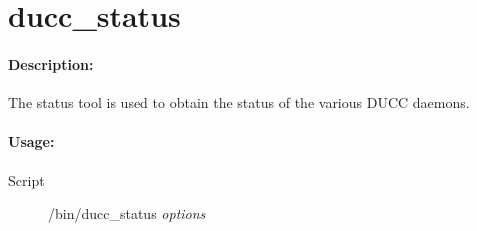 % 
% 
% 
% 
\ifpdf
\else
{}
\fi
    \section{ducc\_status}
    \label{sec:cli.tools-ducc-status}    

  \paragraph{Description:}
    The status tool is used to obtain the status of the various DUCC daemons. 
    
  \paragraph{Usage:}
    \begin{description}
    \item[Script] \ducchome/bin/ducc\_status {\em options}
    \end{description}
    
